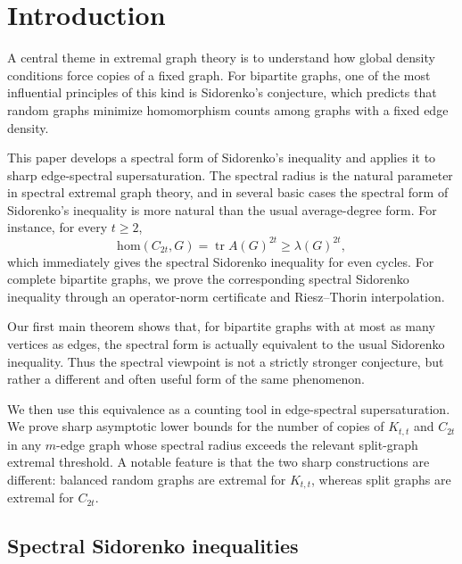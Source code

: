 \documentclass[11pt]{article}
\theoremstyle{definition}
\theoremstyle{plain}
\newcommand{\homc}{\mathrm{hom}}
\begin{document}

\section{Introduction}

A central theme in extremal graph theory is to understand how global
density conditions force copies of a fixed graph.  For bipartite graphs,
one of the most influential principles of this kind is Sidorenko's
conjecture, which predicts that random graphs minimize homomorphism
counts among graphs with a fixed edge density.

This paper develops a spectral form of Sidorenko's inequality and applies
it to sharp edge-spectral supersaturation. The spectral
radius is the natural parameter in spectral extremal graph theory, and
in several basic cases the spectral form of Sidorenko's inequality is
more natural than the usual average-degree form.  For instance, for every $t\ge 2$, 
\begin{equation}\label{eq:even-cycle}
    \homc(C_{2t},G)
        =
        \operatorname{tr} A(G)^{2t}
        \ge
        \lambda(G)^{2t},
\end{equation}
which immediately gives the spectral Sidorenko inequality for even cycles.
For complete bipartite graphs, we prove the corresponding spectral Sidorenko 
inequality through an operator-norm certificate and Riesz--Thorin
interpolation.

Our first main theorem shows that, for bipartite graphs with at most as
many vertices as edges, the spectral form is actually equivalent to the
usual Sidorenko inequality.  Thus the spectral viewpoint is not a
strictly stronger conjecture, but rather a different and often useful
form of the same phenomenon.


We then use this equivalence as a counting tool in edge-spectral
supersaturation.
We prove sharp asymptotic lower bounds
for the number of copies of \(K_{t,t}\) and \(C_{2t}\) in any \(m\)-edge
graph whose spectral radius exceeds the relevant split-graph extremal
threshold.  A notable feature is that the two sharp constructions are
different: balanced random graphs are extremal for \(K_{t,t}\), whereas
split graphs are extremal for \(C_{2t}\).

\subsection{Spectral Sidorenko inequalities}
\end{document}
